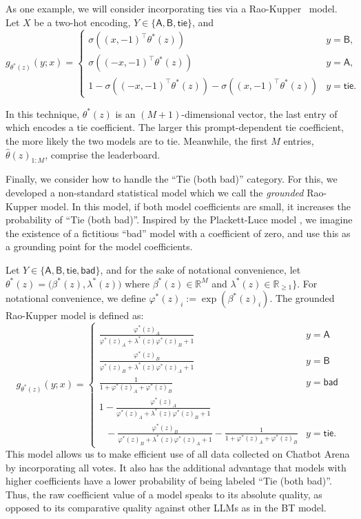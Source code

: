 As one example, we will consider incorporating ties via a Rao-Kupper~\citep{rao1967ties} model.
Let $X$ be a two-hot encoding, $Y \in \{\mathsf{A}, \mathsf{B}, \mathsf{tie}\}$, and
\begin{equation}
    g_{\theta^*(z)}(y ; x) = 
    \begin{cases}
        \sigma((x,-1)^\top \theta^*(z)) & y = \mathsf{B}, \\
        \sigma((-x,-1)^\top \theta^*(z)) &  y = \mathsf{A}, \\
        1 - \sigma((-x,-1)^\top \theta^*(z)) - \sigma((x,-1)^\top \theta^*(z)) & y = \mathsf{tie}.
    \end{cases}
\end{equation}

In this technique, $\theta^*(z)$ is an $(M+1)$-dimensional vector, the last entry of which encodes a tie coefficient.
The larger this prompt-dependent tie coefficient, the more likely the two models are to tie. 
Meanwhile, the first $M$ entries, $\hat\theta(z)_{1:M}$, comprise the leaderboard.

Finally, we consider how to handle the ``Tie (both bad)'' category.
For this, we developed a non-standard statistical model which we call the \emph{grounded} Rao-Kupper model. In this model, if both model coefficients are small, it increases the probability of ``Tie (both bad)''. 
Inspired by the Plackett-Luce model \citep{plackett1975analysis, luce1959individual}, we imagine the existence of a fictitious ``bad'' model with a coefficient of zero, and use this as a grounding point for the model coefficients.

Let $Y\in \{\mathsf{A}, \mathsf{B}, \mathsf{tie}, \mathsf{bad}\}$, and for the sake of notational convenience, let $\theta^*(z) = \big(\beta^*(z), \lambda^*(z)\big)$ where $\beta^*(z) \in \mathbb{R}^M$ and $\lambda^*(z) \in \mathbb{R}_{\geq 1}\}$. For notational convenience, we define $\varphi^*(z)_i := \exp(\beta^*(z)_i)$.
The grounded Rao-Kupper model is defined as:
\begin{equation}
    g_{\theta^*(z)}(y ; x) =
    \begin{cases}
        \frac{\varphi^*(z)_A}{\varphi^*(z)_A + \lambda^*(z)\varphi^*(z)_B + 1} &  y = \mathsf{A} \\
        \frac{\varphi^*(z)_B}{\varphi^*(z)_B + \lambda^*(z)\varphi^*(z)_A + 1} &  y = \mathsf{B}\\
        \frac{1}{1 + \varphi^*(z)_A + \varphi^*(z)_B} & y = \mathsf{bad}\\
        1 - \frac{\varphi^*(z)_A}{\varphi^*(z)_A + \lambda^*(z)\varphi^*(z)_B + 1} \\ \ \ \ - \frac{\varphi^*(z)_B}{\varphi^*(z)_B + \lambda^*(z)\varphi^*(z)_A + 1} - \frac{1}{1 + \varphi^*(z)_A + \varphi^*(z)_B} & y = \mathsf{tie}.
    \end{cases}
\label{eq:grounded-rk}
\end{equation}
This model allows us to make efficient use of all data collected on Chatbot Arena by incorporating all votes.
It also has the additional advantage that models with higher coefficients have a lower probability of being labeled ``Tie (both bad)''.
Thus, the raw coefficient value of a model speaks to its absolute quality, as opposed to its comparative quality against other LLMs as in the BT model.
